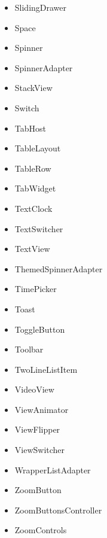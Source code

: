\documentclass[a4paper,14pt]{extarticle} %
\begin{document}
\begin{itemize}
        \item SlidingDrawer
        \item Space
        \item Spinner
        \item SpinnerAdapter
        \item StackView
        \item Switch
        \item TabHost
        \item TableLayout
        \item TableRow
        \item TabWidget
        \item TextClock
        \item TextSwitcher
        \item TextView
        \item ThemedSpinnerAdapter
        \item TimePicker
        \item Toast
        \item ToggleButton
        \item Toolbar
        \item TwoLineListItem
        \item VideoView
        \item ViewAnimator
        \item ViewFlipper
        \item ViewSwitcher
        \item WrapperListAdapter
        \item ZoomButton
        \item ZoomButtonsController
        \item ZoomControls
	\end{itemize}
\end{document}
